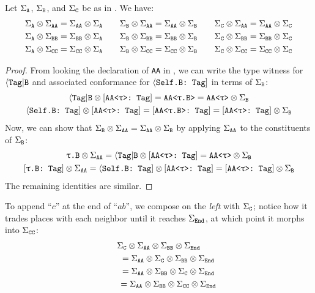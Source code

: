 \documentclass[../generics]{subfiles}
\begin{document}
\begin{lemma}\label{tag abc lemma}
Let $\Sigma_{\texttt{A}}$, $\Sigma_{\texttt{B}}$, and $\Sigma_{\texttt{C}}$ be as in . We have:
\begin{gather*}
\Sigma_{\texttt{A}}\otimes\Sigma_{\texttt{AA}}=\Sigma_{\texttt{AA}}\otimes\Sigma_{\texttt{A}} \qquad \Sigma_{\texttt{B}}\otimes\Sigma_{\texttt{AA}}=\Sigma_{\texttt{AA}}\otimes\Sigma_{\texttt{B}} \qquad \Sigma_{\texttt{C}}\otimes\Sigma_{\texttt{AA}}=\Sigma_{\texttt{AA}}\otimes\Sigma_{\texttt{C}}\\
\Sigma_{\texttt{A}}\otimes\Sigma_{\texttt{BB}}=\Sigma_{\texttt{BB}}\otimes\Sigma_{\texttt{A}} \qquad \Sigma_{\texttt{B}}\otimes\Sigma_{\texttt{BB}}=\Sigma_{\texttt{BB}}\otimes\Sigma_{\texttt{B}} \qquad \Sigma_{\texttt{C}}\otimes\Sigma_{\texttt{BB}}=\Sigma_{\texttt{BB}}\otimes\Sigma_{\texttt{C}}\\
\Sigma_{\texttt{A}}\otimes\Sigma_{\texttt{CC}}=\Sigma_{\texttt{CC}}\otimes\Sigma_{\texttt{A}} \qquad \Sigma_{\texttt{B}}\otimes\Sigma_{\texttt{CC}}=\Sigma_{\texttt{CC}}\otimes\Sigma_{\texttt{B}} \qquad \Sigma_{\texttt{C}}\otimes\Sigma_{\texttt{CC}}=\Sigma_{\texttt{CC}}\otimes\Sigma_{\texttt{C}}
\end{gather*}
\end{lemma}
\begin{proof}
From looking the declaration of \texttt{AA} in , we can write the type witness for $\langle\texttt{Tag}|\texttt{B}$ and associated conformance for $\langle\texttt{Self.B:~Tag}]$ in terms of $\Sigma_{\texttt{B}}$:
\begin{gather*}
\langle\texttt{Tag}|\texttt{B} \otimes [\texttt{AA<$\uptau$>:~Tag}] = \texttt{AA<$\uptau$.B>} = \texttt{AA<$\uptau$>} \otimes \Sigma_{\texttt{B}}\\
\langle\texttt{Self.B:~Tag}] \otimes [\texttt{AA<$\uptau$>:~Tag}] = [\texttt{AA<$\uptau$.B>:~Tag}] = [\texttt{AA<$\uptau$>:~Tag}] \otimes \Sigma_{\texttt{B}}
\end{gather*}
Now, we can show that $\Sigma_{\texttt{B}}\otimes\Sigma_{\texttt{AA}} = \Sigma_{\texttt{AA}}\otimes\Sigma_{\texttt{B}}$ by applying $\Sigma_{\texttt{AA}}$ to the constituents of $\Sigma_{\texttt{B}}$:
\begin{gather*}
\texttt{$\uptau$.B} \otimes \SigmaAA = \AssocTypeB \otimes \ConfAATag = \texttt{AA<$\uptau$>} \otimes \SigmaB\\
\ConfReq{$\uptau$.B}{Tag} \otimes \SigmaAA = \AssocConfBTag \otimes \ConfAATag = \ConfAATag \otimes \SigmaB
\end{gather*}
The remaining identities are similar.
\end{proof}

\begin{example}
To append ``$c$'' at the end of ``$ab$'', we compose on the \emph{left} with $\Sigma_{\texttt{C}}$; notice how it trades places with each neighbor until it reaches $\Sigma_{\texttt{End}}$, at which point it morphs into $\Sigma_{\texttt{CC}}$:
\begin{gather*}
\Sigma_{\texttt{C}}\otimes\Sigma_{\texttt{AA}}\otimes\Sigma_{\texttt{BB}}\otimes\Sigma_{\texttt{End}}\\
\qquad {} = \Sigma_{\texttt{AA}}\otimes\Sigma_{\texttt{C}}\otimes\Sigma_{\texttt{BB}}\otimes\Sigma_{\texttt{End}}\\
\qquad {} = \Sigma_{\texttt{AA}}\otimes\Sigma_{\texttt{BB}}\otimes\Sigma_{\texttt{C}}\otimes\Sigma_{\texttt{End}}\\
\qquad {} = \Sigma_{\texttt{AA}}\otimes\Sigma_{\texttt{BB}}\otimes\Sigma_{\texttt{CC}}\otimes\Sigma_{\texttt{End}}
\end{gather*}
\end{example}
\end{document}
